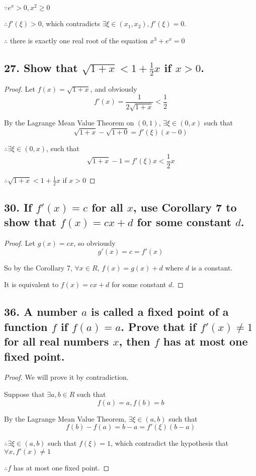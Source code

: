 \documentclass{article}
\begin{document}
    $\because e^x > 0, x^2 \geq 0$

    $\therefore f'(\xi) > 0$, which contradicts $\exists \xi \in (x_1, x_2), f'(\xi) = 0$.

    $\therefore$ there is exactly one real root of the equation $x^3 + e^x = 0$

    \subsection*{27. Show that $\sqrt{1 + x} < 1 + \frac 1 2 x$ if $x > 0$.}

    \begin{proof}
        Let $f(x) = \sqrt{1 + x}$, and obviously $$f'(x) = \frac{1}{2\sqrt{1 + x}} < \frac 1 2$$

        By the Lagrange Mean Value Theorem on $(0, 1)$, $\exists \xi \in (0, x)$ such that $$\sqrt{1 + x} - \sqrt{1 + 0} = f'(\xi)(x - 0)$$

        $\therefore \exists \xi \in (0, x)$, such that $$\sqrt{1 + x} - 1 = f'(\xi)x < \frac 1 2 x$$

        $\therefore \sqrt{1 + x} < 1 + \frac 1 2 x$ if $x > 0$
    \end{proof}

    \subsection*{30. If $f'(x) = c$ for all $x$, use Corollary 7 to show that $f(x) = cx + d$ for some constant $d$.}

    \begin{proof}
        Let $g(x) = cx$, so obviously $$g'(x) = c = f'(x)$$

        So by the Corollary 7, $\forall x \in R$, $f(x) = g(x) + d$ where $d$ is a constant.

        It is equivalent to $f(x) = cx + d$ for some constant $d$.
    \end{proof}

    \subsection*{36. A number $a$ is called a \textbf{fixed point} of a function $f$ if $f(a) = a$. Prove that if $f'(x) \not = 1$ for all real numbers $x$, then $f$ has at most one fixed point.}

    \begin{proof}
        We will prove it by contradiction.

        Suppose that $\exists a, b \in R$ such that $$f(a) = a, f(b) = b$$

        By the Lagrange Mean Value Theorem, $\exists \xi \in (a, b)$ such that $$f(b) - f(a) = b - a = f'(\xi) (b - a) $$

        $\therefore \exists \xi \in (a,b)$ such that $f(\xi) = 1$, which contradict the hypothesis that $\forall x, f'(x) \not = 1$

        $\therefore f$ has at most one fixed point.
    \end{proof}
\end{document}

